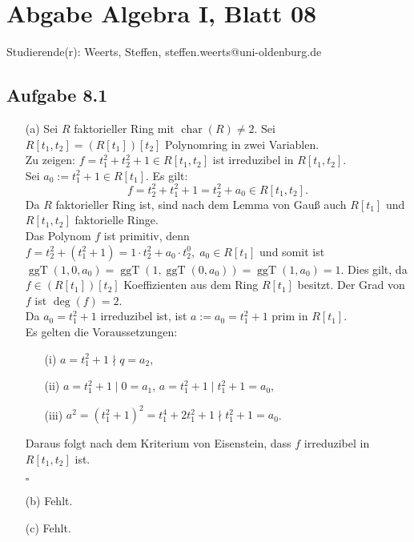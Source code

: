 \documentclass[12pt]{article}
\newcommand{\QED}{\begin{flushright} $\square$ \end{flushright}}
\newcommand{\Char}{\operatorname{char}}
\newcommand{\ggT}{\operatorname{ggT}}
\newcommand{\grad}{\operatorname{deg}}
\begin{document}
\section*{Abgabe Algebra I, Blatt 08}

Studierende(r): Weerts, Steffen, steffen.weerts@uni-oldenburg.de

\subsection*{Aufgabe 8.1}
\begin{enumerate}
	\item[(a)] Sei $R$ faktorieller Ring mit $\Char(R)\neq2$. Sei $R[t_1,t_2]=(R[t_1])[t_2]$ Polynomring in zwei Variablen. \\
	Zu zeigen: $f=t_1^2+t_2^2+1\in R[t_1,t_2]$ ist irreduzibel in $R[t_1,t_2]$. \\
	Sei $a_0:=t_1^2+1\in R[t_1]$. Es gilt: $$f=t_2^2+t_1^2+1=t_2^2+a_0\in R[t_1,t_2].$$
	Da $R$ faktorieller Ring ist, sind nach dem Lemma von Gauß auch $R[t_1]$ und $R[t_1,t_2]$ faktorielle Ringe. \\
	Das Polynom $f$ ist primitiv, denn $f=t_2^2+(t_1^2+1)=1\cdot t_2^2+a_0\cdot t_2^0,\; a_0\in R[t_1]$ und somit ist $\ggT(1,0,a_0)=\ggT(1,\ggT(0,a_0))=\ggT(1,a_0)=1$. Dies gilt, da $f\in (R[t_1])[t_2]$ Koeffizienten aus dem Ring $R[t_1]$ besitzt. Der Grad von $f$ ist $\grad(f)=2$. \\
	Da $a_0=t_1^2+1$ irreduzibel ist, ist $a:=a_0=t_1^2+1$ prim in $R[t_1]$. \\
	Es gelten die Voraussetzungen:
	\begin{enumerate}
		\item[(i)] $a=t_1^2+1\nmid q=a_2$,
		\item[(ii)] $a=t_1^2+1\mid 0=a_1$, $a=t_1^2+1\mid t_1^2+1=a_0$,
		\item[(iii)] $a^2=(t_1^2+1)^2=t_1^4+2t_1^2+1\nmid t_1^2+1=a_0$.
	\end{enumerate}
	Daraus folgt nach dem Kriterium von Eisenstein, dass $f$ irreduzibel in $R[t_1,t_2]$ ist.
	\QED
	
	\item[(b)] Fehlt.
	
	\item[(c)] Fehlt.
\end{enumerate}
\end{document}
